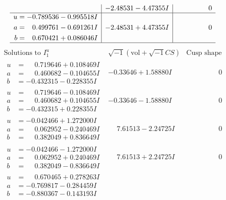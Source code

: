 \documentclass[1p]{elsarticle_modified}
\theoremstyle{definition}
\newcommand{\I}{\sqrt{-1}}
\begin{document}
$$\begin{array}{c|c|c}
 & -2.48531 - 4.47355 I & \phantom{-0.000000 } 0 \\ \hline\begin{aligned}
u &= -0.789536 - 0.995518 I \\
a &= \phantom{-}0.499761 - 0.691261 I \\
b &= \phantom{-}0.670421 + 0.086046 I\end{aligned}
 & -2.48531 + 4.47355 I & \phantom{-0.000000 } 0\\
 \hline 
 \end{array}$$\newpage$$\begin{array}{c|c|c}  
\text{Solutions to }I^u_{1}& \I (\text{vol} + \sqrt{-1}CS) & \text{Cusp shape}\\
 \hline 
\begin{aligned}
u &= \phantom{-}0.719646 + 0.108469 I \\
a &= \phantom{-}0.460682 - 0.104655 I \\
b &= -0.432315 - 0.228355 I\end{aligned}
 & -0.33646 + 1.58880 I & \phantom{-0.000000 } 0 \\ \hline\begin{aligned}
u &= \phantom{-}0.719646 - 0.108469 I \\
a &= \phantom{-}0.460682 + 0.104655 I \\
b &= -0.432315 + 0.228355 I\end{aligned}
 & -0.33646 - 1.58880 I & \phantom{-0.000000 } 0 \\ \hline\begin{aligned}
u &= -0.042466 + 1.272000 I \\
a &= \phantom{-}0.062952 - 0.240469 I \\
b &= \phantom{-}0.382049 + 0.836649 I\end{aligned}
 & \phantom{-}7.61513 - 2.24725 I & \phantom{-0.000000 } 0 \\ \hline\begin{aligned}
u &= -0.042466 - 1.272000 I \\
a &= \phantom{-}0.062952 + 0.240469 I \\
b &= \phantom{-}0.382049 - 0.836649 I\end{aligned}
 & \phantom{-}7.61513 + 2.24725 I & \phantom{-0.000000 } 0 \\ \hline\begin{aligned}
u &= \phantom{-}0.670465 + 0.278263 I \\
a &= -0.769817 - 0.284459 I \\
b &= -0.880367 - 0.143193 I\end{aligned}

\end{array}$$
\end{document}
